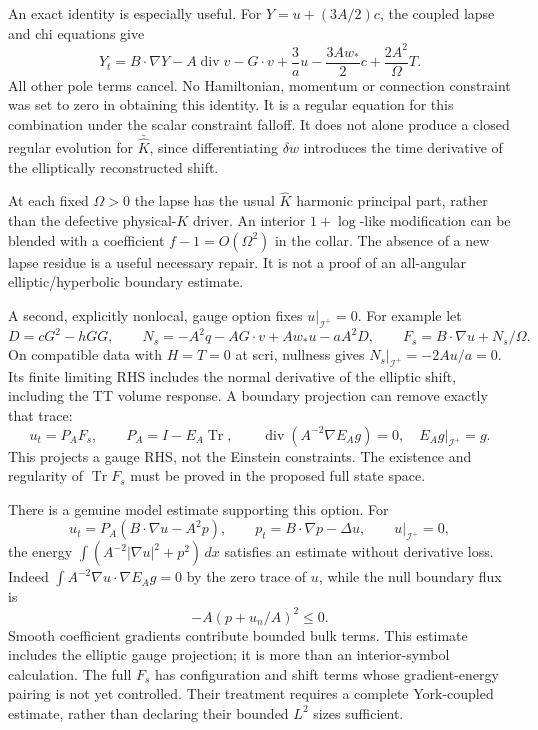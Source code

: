 \documentclass[11pt]{article}
\newcommand{\scri}{\mathscr I^+}
\begin{document}
An exact identity is especially useful. For
$Y=u+(3A/2)c$, the coupled lapse and chi equations give
\[
\boxed{
Y_t=B\cdot\nabla Y-A\operatorname{div}v-G\cdot v
+\frac3a u-\frac{3Aw_*}{2}c+\frac{2A^2}{\Omega}T .
}
\]
All other pole terms cancel. No Hamiltonian, momentum or connection
constraint was set to zero in obtaining this identity.
It is a regular equation for this combination under the scalar
constraint falloff. It does not alone produce a closed regular
evolution for $\bar{\hat K}$, since differentiating
$\delta w$ introduces the time derivative of the elliptically
reconstructed shift.

At each fixed $\Omega>0$ the lapse has the usual $\hat K$ harmonic
principal part, rather than the defective physical-$K$ driver.
An interior $1+\log$-like modification can be blended with a coefficient
$f-1=O(\Omega^2)$ in the collar. The absence of a new lapse residue is
a useful necessary repair. It is not a proof of an all-angular
elliptic/hyperbolic boundary estimate.

A second, explicitly nonlocal, gauge option fixes $u|_{\scri}=0$.
For example let
\[
D=cG^2-hGG,\qquad
N_s=-A^2q-AG\cdot v+Aw_*u-aA^2D,
\qquad F_s=B\cdot\nabla u+N_s/\Omega .
\]
On compatible data with $H=T=0$ at scri, nullness gives
$N_s|_{\scri}=-2Au/a=0$. Its finite limiting RHS includes the
normal derivative of the elliptic shift, including the TT volume
response. A boundary projection can remove exactly that trace:
\[
u_t=P_AF_s,\qquad
P_A=I-E_A\operatorname{Tr},\qquad
\operatorname{div}(A^{-2}\nabla E_Ag)=0,\quad E_Ag|_{\scri}=g.
\]
This projects a gauge RHS, not the Einstein constraints. The
existence and regularity of $\operatorname{Tr}F_s$ must be proved
in the proposed full state space.

There is a genuine model estimate supporting this option. For
\[
u_t=P_A(B\cdot\nabla u-A^2p),\qquad
p_t=B\cdot\nabla p-\Delta u,\qquad u|_{\scri}=0,
\]
the energy
$\int(A^{-2}|\nabla u|^2+p^2)\,dx$ satisfies an estimate
without derivative loss. Indeed
$\int A^{-2}\nabla u\cdot\nabla E_Ag=0$ by the zero trace
of $u$, while the null boundary flux is
\[
-A(p+u_n/A)^2\leq0.
\]
Smooth coefficient gradients contribute bounded bulk terms.
This estimate includes the elliptic gauge projection; it is more than
an interior-symbol calculation. The full $F_s$ has configuration and
shift terms whose gradient-energy pairing is not yet controlled.
Their treatment requires a complete York-coupled estimate, rather
than declaring their bounded $L^2$ sizes sufficient.
\end{document}
